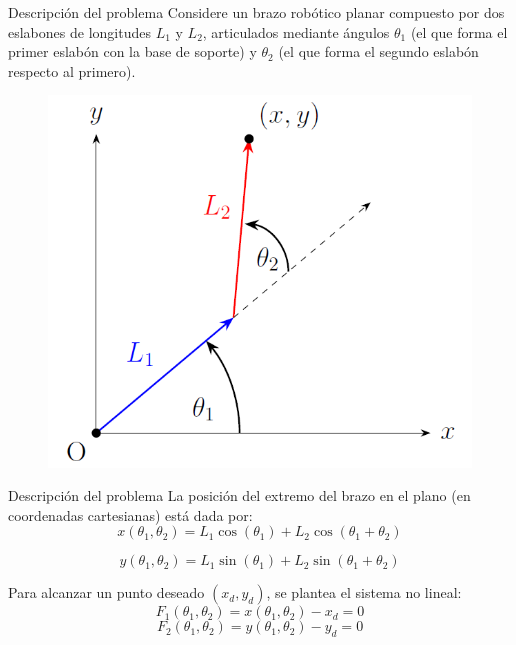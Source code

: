 \begin{frame}{Descripción del problema}
Considere un brazo robótico planar compuesto por dos eslabones de longitudes \(L_{1}\) y \(L_{2}\), articulados mediante ángulos \(\theta_{1}\) (el que forma el primer eslabón con la base de soporte) y \(\theta_{2}\) (el que forma el segundo eslabón respecto al primero).

\begin{figure}
    \centering
    \includegraphics[width=0.35\linewidth]{graphics/grafica_descripcion.png}
\end{figure}  
\end{frame}

\begin{frame}{Descripción del problema}
La posición del extremo del brazo en el plano (en coordenadas cartesianas) está dada por:
\[
x(\theta_{1}, \theta_{2}) = L_{1}\cos(\theta_{1}) + L_{2}\cos(\theta_{1}+\theta_{2})
\]

\[
y(\theta_{1}, \theta_{2}) = L_{1}\sin(\theta_{1}) + L_{2}\sin(\theta_{1}+\theta_{2})
\]

Para alcanzar un punto deseado \((x_{d}, y_{d})\), se plantea el sistema no lineal:
\[
F_{1}(\theta_{1}, \theta_{2}) = x(\theta_{1}, \theta_{2}) - x_{d} = 0
\]
\[
F_{2}(\theta_{1}, \theta_{2}) = y(\theta_{1}, \theta_{2}) - y_{d} = 0
\]
\end{frame}
